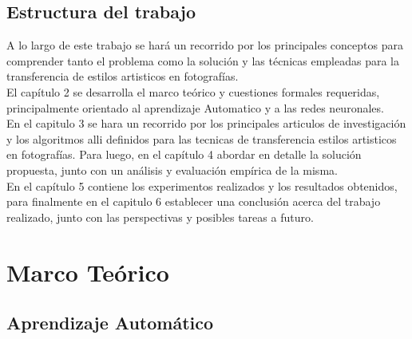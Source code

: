 \documentclass[a4paper,11pt,spanish]{book}
\begin{document}
  \section {Estructura del trabajo}
    A lo largo de este trabajo se hará un recorrido por los principales conceptos para comprender tanto el problema como la solución y las técnicas empleadas para la transferencia
    de estilos artisticos en fotografías.\\
    El capítulo 2 se desarrolla el marco teórico y cuestiones formales requeridas, principalmente orientado al aprendizaje Automatico y a las redes neuronales.\\
    En el capitulo 3 se hara un recorrido por los principales articulos de investigación y los algoritmos alli definidos para las tecnicas de transferencia estilos artisticos en fotografías.
    Para luego, en el capítulo 4 abordar en detalle la solución propuesta, junto con un análisis y evaluación empírica de la misma.\\
    En el capítulo 5 contiene los experimentos realizados y los resultados obtenidos, para finalmente en el capitulo 6 establecer una conclusión acerca del trabajo realizado, 
    junto con las perspectivas y posibles tareas a futuro.\\

\chapter{Marco Teórico}




  \section{Aprendizaje Automático}
\end{document}
